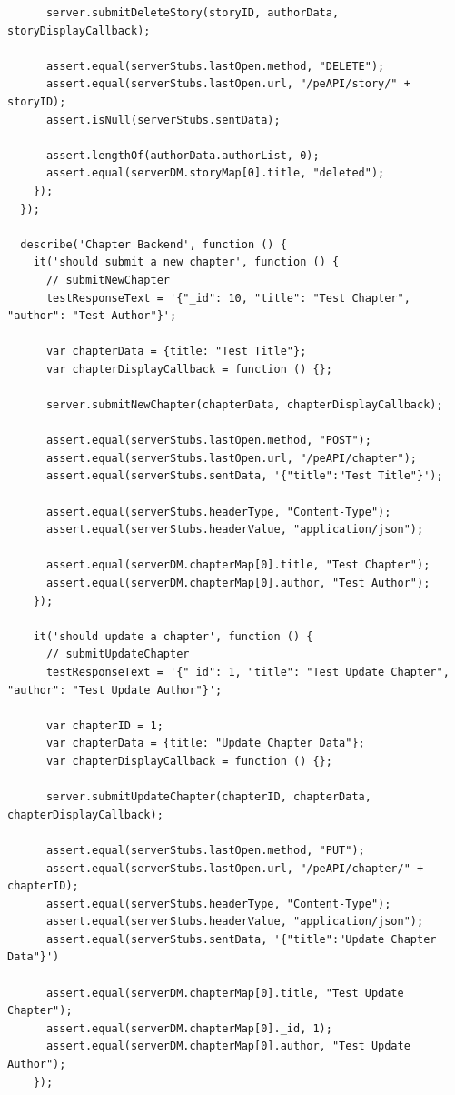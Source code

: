 \documentclass[12pt]{ucthesis}
\begin{document}
\begin{lstlisting}
      server.submitDeleteStory(storyID, authorData, storyDisplayCallback);

      assert.equal(serverStubs.lastOpen.method, "DELETE");
      assert.equal(serverStubs.lastOpen.url, "/peAPI/story/" + storyID);
      assert.isNull(serverStubs.sentData);

      assert.lengthOf(authorData.authorList, 0);
      assert.equal(serverDM.storyMap[0].title, "deleted");
    });
  });

  describe('Chapter Backend', function () {
    it('should submit a new chapter', function () {
      // submitNewChapter
      testResponseText = '{"_id": 10, "title": "Test Chapter", "author": "Test Author"}';

      var chapterData = {title: "Test Title"};
      var chapterDisplayCallback = function () {};

      server.submitNewChapter(chapterData, chapterDisplayCallback);

      assert.equal(serverStubs.lastOpen.method, "POST");
      assert.equal(serverStubs.lastOpen.url, "/peAPI/chapter");
      assert.equal(serverStubs.sentData, '{"title":"Test Title"}');

      assert.equal(serverStubs.headerType, "Content-Type");
      assert.equal(serverStubs.headerValue, "application/json");

      assert.equal(serverDM.chapterMap[0].title, "Test Chapter");
      assert.equal(serverDM.chapterMap[0].author, "Test Author");
    });

    it('should update a chapter', function () {
      // submitUpdateChapter      
      testResponseText = '{"_id": 1, "title": "Test Update Chapter", "author": "Test Update Author"}';

      var chapterID = 1;
      var chapterData = {title: "Update Chapter Data"};
      var chapterDisplayCallback = function () {};

      server.submitUpdateChapter(chapterID, chapterData, chapterDisplayCallback);

      assert.equal(serverStubs.lastOpen.method, "PUT");
      assert.equal(serverStubs.lastOpen.url, "/peAPI/chapter/" + chapterID);
      assert.equal(serverStubs.headerType, "Content-Type");
      assert.equal(serverStubs.headerValue, "application/json");
      assert.equal(serverStubs.sentData, '{"title":"Update Chapter Data"}')

      assert.equal(serverDM.chapterMap[0].title, "Test Update Chapter");
      assert.equal(serverDM.chapterMap[0]._id, 1);
      assert.equal(serverDM.chapterMap[0].author, "Test Update Author");
    });


\end{lstlisting}
\end{document}

